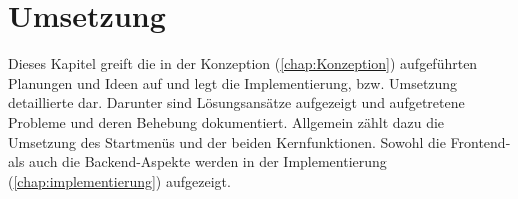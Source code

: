

\chapter{Umsetzung}
\label{chap:Umsetzung}
Dieses Kapitel greift die in der Konzeption (\ref{chap:Konzeption}) aufgeführten Planungen und Ideen auf und legt die Implementierung, bzw. 
Umsetzung detaillierte dar. Darunter sind Lösungsansätze aufgezeigt und aufgetretene Probleme und deren Behebung dokumentiert. Allgemein zählt 
dazu die Umsetzung des Startmenüs und der beiden Kernfunktionen. Sowohl die Frontend- als auch die Backend-Aspekte werden in der Implementierung 
(\ref{chap:implementierung}) aufgezeigt. 

